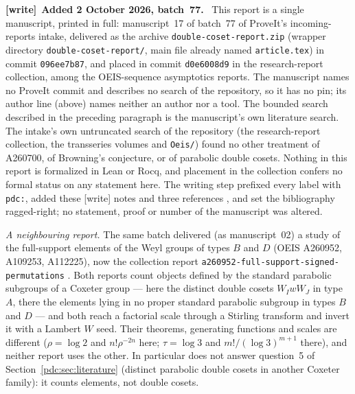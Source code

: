 \documentclass[11pt,letterpaper]{article}
\theoremstyle{remark}\newtheorem{remark}[theorem]{Remark}
\newenvironment{writenote}[1][]{\par\smallskip\begingroup\small
 \noindent\textbf{[write]}\if\relax\detokenize{#1}\relax\else~\textbf{#1.}\fi\ }%
 {\par\endgroup\smallskip}
\begin{document}
\begin{writenote}[Added 2 October 2026, batch~77]
This report is a single manuscript, printed in full: manuscript~17 of
batch~77 of ProveIt's incoming-reports intake, delivered as the archive
\texttt{double-\allowbreak coset-\allowbreak report.zip} (wrapper directory
\texttt{double-\allowbreak coset-\allowbreak report/}, main file already
named \texttt{article.tex}) in commit \texttt{096ee7b87}, and placed in
commit \texttt{d0e6008d9} in the research-report collection, among the
OEIS-sequence asymptotics reports. The manuscript names no ProveIt commit
and describes no search of the repository, so it has no pin; its author
line (above) names neither an author nor a tool. The bounded search
described in the preceding paragraph is the manuscript's own literature
search. The intake's own untruncated search of the repository (the
research-report collection, the transseries volumes and \texttt{Oeis/})
found no other treatment of A260700, of Browning's conjecture, or of
parabolic double cosets. Nothing in this report is formalized in Lean or
Rocq, and placement in the collection confers no formal status on any
statement here. The writing step prefixed every label with \texttt{pdc:},
added these \textsf{[write]} notes and three references
\cite{pdc-fss,pdc-tai,pdc-cti}, and set the bibliography ragged-right; no
statement, proof or number of the manuscript was altered.

\emph{A neighbouring report.} The same batch delivered (as manuscript~02)
a study of the full-support elements of the Weyl groups of types $B$ and
$D$ (OEIS A260952, A109253, A112225), now the collection report
\texttt{a260952-\allowbreak full-\allowbreak support-\allowbreak signed-\allowbreak permutations}
\cite{pdc-fss}. Both reports count objects defined by the standard
parabolic subgroups of a Coxeter group --- here the distinct double cosets
$W_IwW_J$ in type $A$, there the elements lying in no proper standard
parabolic subgroup in types $B$ and $D$ --- and both reach a factorial
scale through a Stirling transform and invert it with a Lambert $W$ seed.
Their theorems, generating functions and scales are different ($\rho=\log
2$ and $n!\rho^{-2n}$ here; $\tau=\log3$ and $m!/(\log3)^{m+1}$ there),
and neither report uses the other. In particular \cite{pdc-fss} does not
answer question~5 of Section~\ref{pdc:sec:literature} (distinct parabolic
double cosets in another Coxeter family): it counts elements, not double
cosets.


\end{writenote}
\end{document}
